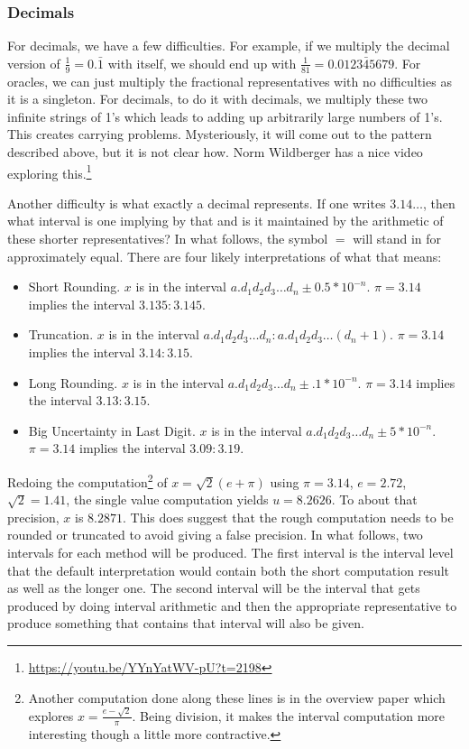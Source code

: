 \documentclass[12pt]{article}
\theoremstyle{remark}
\begin{document}
\subsubsection{Decimals}

For decimals, we have a few difficulties. For example, if we multiply the decimal version of $\frac{1}{9} = 0.\bar{1}$ with itself, we should end up with $\frac{1}{81} = 0.\bar{012345679}$. For oracles, we can just multiply the fractional representatives with no difficulties as it is a singleton. For decimals, to do it with decimals, we multiply these two infinite strings of 1's which leads to adding up arbitrarily large numbers of 1's. This creates carrying problems. Mysteriously, it will come out to the pattern described above, but it is not clear how. Norm Wildberger has a nice video exploring this.\footnote{\url{https://youtu.be/YYnYatWV-pU?t=2198}}

Another difficulty is what exactly a decimal represents. If one writes $3.14\ldots$, then what interval is one implying by that and is it maintained by the arithmetic of these shorter representatives? In what follows, the symbol $=$ will stand in for approximately equal. There are four likely interpretations of what that means:

\begin{itemize}
\item Short Rounding. $x$ is in the interval $a.d_1d_2d_3\ldots d_n \pm 0.5*10^{-n}$. $\pi = 3.14$ implies the interval $3.135:3.145$.
\item Truncation. $x$ is in the interval $a.d_1d_2d_3\ldots d_n: a.d_1d_2d_3\ldots (d_n+1)$. $\pi=3.14$ implies the interval $3.14:3.15$.
\item Long Rounding. $x$ is in the interval $a.d_1d_2d_3\ldots d_n \pm .1*10^{-n}$. $\pi = 3.14$ implies the interval $3.13:3.15$. 
\item Big Uncertainty in Last Digit. $x$ is in the interval $a.d_1d_2d_3\ldots d_n \pm 5*10^{-n}$. $\pi = 3.14$ implies the interval $3.09:3.19$. 
\end{itemize}

Redoing the computation\footnote{Another computation done along these lines is in the overview paper \cite{taylor23over} which explores $x = \frac{e-\sqrt{2}}{\pi}$. Being division, it makes the interval computation more interesting though a little more contractive.} of $x = \sqrt{2}(e+\pi)$  using $\pi = 3.14$, $e=2.72$, $\sqrt{2} = 1.41$, the single value computation yields $u = 8.2626$. To about that precision, $x$ is $8.2871$. This does suggest that the rough computation needs to be rounded or truncated to avoid giving a false precision. In what follows, two intervals for each method will be produced. The first interval is the interval level that the default interpretation would contain both the short computation result as well as the longer one. The second interval will be the interval that gets produced by doing interval arithmetic and then the appropriate representative to produce something that contains that interval will also be given. 
\end{document}
